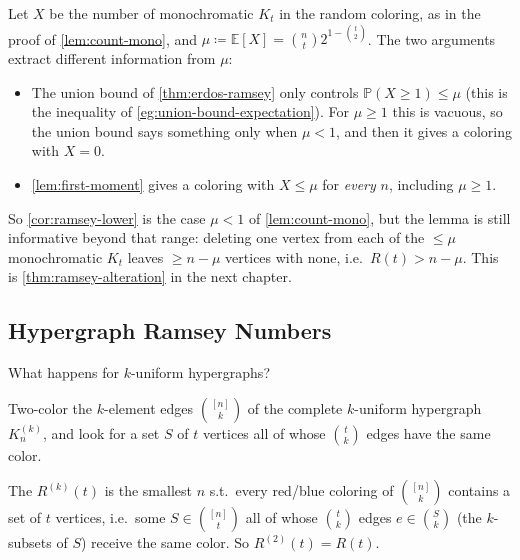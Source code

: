 \begin{remark}
    Let \(X\) be the number of monochromatic \(K_t\) in the random coloring, as in the proof of \autoref{lem:count-mono}, and \(\mu \coloneqq \mathbb{E}[X] = \binom{n}{t} 2^{1-\binom{t}{2}}\). The two arguments extract different information from \(\mu\):
    \begin{itemize}
        \item The union bound of \autoref{thm:erdos-ramsey} only controls \(\mathbb{P}(X \ge 1) \le \mu\) (this is the inequality of \autoref{eg:union-bound-expectation}). For \(\mu \ge 1\) this is vacuous, so the union bound says something only when \(\mu < 1\), and then it gives a coloring with \(X = 0\).
        \item \autoref{lem:first-moment} gives a coloring with \(X \le \mu\) for \emph{every} \(n\), including \(\mu \ge 1\).
    \end{itemize}
    So \autoref{cor:ramsey-lower} is the case \(\mu < 1\) of \autoref{lem:count-mono}, but the lemma is still informative beyond that range: deleting one vertex from each of the \(\le \mu\) monochromatic \(K_t\) leaves \(\ge n - \mu\) vertices with none, i.e.\ \(R(t) > n - \mu\). This is \autoref{thm:ramsey-alteration} in the next chapter.
\end{remark}

\subsection{Hypergraph Ramsey Numbers}

\begin{question}
    What happens for \(k\)-uniform hypergraphs?
\end{question}

Two-color the \(k\)-element edges \(\binom{[n]}{k}\) of the complete \(k\)-uniform hypergraph \(K_n^{(k)}\), and look for a set \(S\) of \(t\) vertices all of whose \(\binom{t}{k}\) edges have the same color.

\begin{definition}\label{def:hypergraph-ramsey}
    The  \(R^{(k)}(t)\) is the smallest \(n\) s.t.\ every red/blue coloring of \(\binom{[n]}{k}\) contains a  set of \(t\) vertices, i.e.\ some \(S \in \binom{[n]}{t}\) all of whose \(\binom{t}{k}\) edges \(e \in \binom{S}{k}\) (the \(k\)-subsets of \(S\)) receive the same color. So \(R^{(2)}(t) = R(t)\).
\end{definition}

